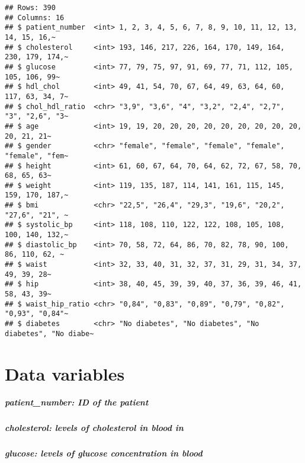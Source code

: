 \documentclass[
]{article}
\begin{document}
\begin{verbatim}
## Rows: 390
## Columns: 16
## $ patient_number  <int> 1, 2, 3, 4, 5, 6, 7, 8, 9, 10, 11, 12, 13, 14, 15, 16,~
## $ cholesterol     <int> 193, 146, 217, 226, 164, 170, 149, 164, 230, 179, 174,~
## $ glucose         <int> 77, 79, 75, 97, 91, 69, 77, 71, 112, 105, 105, 106, 99~
## $ hdl_chol        <int> 49, 41, 54, 70, 67, 64, 49, 63, 64, 60, 117, 63, 34, 7~
## $ chol_hdl_ratio  <chr> "3,9", "3,6", "4", "3,2", "2,4", "2,7", "3", "2,6", "3~
## $ age             <int> 19, 19, 20, 20, 20, 20, 20, 20, 20, 20, 20, 20, 21, 21~
## $ gender          <chr> "female", "female", "female", "female", "female", "fem~
## $ height          <int> 61, 60, 67, 64, 70, 64, 62, 72, 67, 58, 70, 68, 65, 63~
## $ weight          <int> 119, 135, 187, 114, 141, 161, 115, 145, 159, 170, 187,~
## $ bmi             <chr> "22,5", "26,4", "29,3", "19,6", "20,2", "27,6", "21", ~
## $ systolic_bp     <int> 118, 108, 110, 122, 122, 108, 105, 108, 100, 140, 132,~
## $ diastolic_bp    <int> 70, 58, 72, 64, 86, 70, 82, 78, 90, 100, 86, 110, 62, ~
## $ waist           <int> 32, 33, 40, 31, 32, 37, 31, 29, 31, 34, 37, 49, 39, 28~
## $ hip             <int> 38, 40, 45, 39, 39, 40, 37, 36, 39, 46, 41, 58, 43, 39~
## $ waist_hip_ratio <chr> "0,84", "0,83", "0,89", "0,79", "0,82", "0,93", "0,84"~
## $ diabetes        <chr> "No diabetes", "No diabetes", "No diabetes", "No diabe~
\end{verbatim}

\hypertarget{data-variables}{%
\section{Data variables}\label{data-variables}}

\hypertarget{patient_number-id-of-the-patient}{%
\subparagraph{\texorpdfstring{\textbf{patient\_number}: ID of the
patient}{patient\_number: ID of the patient}}\label{patient_number-id-of-the-patient}}

\hypertarget{cholesterol-levels-of-cholesterol-in-blood-in}{%
\subparagraph{\texorpdfstring{\textbf{cholesterol}: levels of
cholesterol in blood
in}{cholesterol: levels of cholesterol in blood in}}\label{cholesterol-levels-of-cholesterol-in-blood-in}}

\hypertarget{glucose-levels-of-glucose-concentration-in-blood}{%
\subparagraph{\texorpdfstring{\textbf{glucose}: levels of glucose
concentration in
blood}{glucose: levels of glucose concentration in blood}}\label{glucose-levels-of-glucose-concentration-in-blood}}
\end{document}
